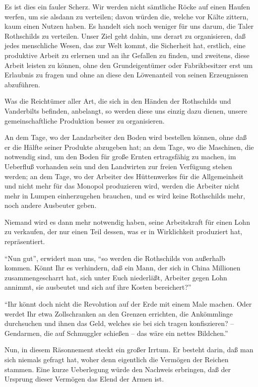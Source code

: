 \documentclass{scrbook}
\begin{document}
Es ist dies ein fauler Scherz. Wir werden nicht sämtliche Röcke auf einen Haufen werfen, um sie alsdann zu verteilen; davon würden die, welche vor Kälte zittern, kaum einen Nutzen haben. Es handelt sich noch weniger für uns darum, die Taler Rothschilds zu verteilen. Unser Ziel geht dahin, uns derart zu organisieren, daß jedes menschliche Wesen, das zur Welt kommt, die Sicherheit hat, erstlich, eine produktive Arbeit zu erlernen und an ihr Gefallen zu finden, und zweitens, diese Arbeit leisten zu können, ohne den Grundeigentümer oder Fabrikbesitzer erst um Erlaubnis zu fragen und ohne an diese den Löwenanteil von seinen Erzeugnissen abzuführen.

Was die Reichtümer aller Art, die sich in den Händen der Rothschilds und Vanderbilts befinden, anbelangt, so werden diese uns einzig dazu dienen, unsere gemeinschaftliche Produktion besser zu organisieren.

An dem Tage, wo der Landarbeiter den Boden wird bestellen können, ohne daß er die Hälfte seiner Produkte abzugeben hat; an dem Tage, wo die Maschinen, die notwendig sind, um den Boden für große Ernten ertragsfähig zu machen, im Ueberfluß vorhanden sein und den Landwirten zur freien Verfügung stehen werden; an dem Tage, wo der Arbeiter des Hüttenwerkes für die Allgemeinheit und nicht mehr für das Monopol produzieren wird, werden die Arbeiter nicht mehr in Lumpen einherzugehen brauchen, und es wird keine Rothschilds mehr, noch andere Ausbeuter geben.

Niemand wird es dann mehr notwendig haben, seine Arbeitskraft für einen Lohn zu verkaufen, der nur einen Teil dessen, was er in Wirklichkeit produziert hat, repräsentiert.

``Nun gut'', erwidert man uns, ``so werden die Rothschilds von außerhalb kommen. Könnt Ihr es verhindern, daß ein Mann, der sich in China Millionen zusammengescharrt hat, sich unter Euch niederläßt, Arbeiter gegen Lohn annimmt, sie ausbeutet und sich auf ihre Kosten bereichert?''

``Ihr könnt doch nicht die Revolution auf der Erde mit einem Male machen. Oder werdet Ihr etwa Zollschranken an den Grenzen errichten, die Ankömmlinge durchsuchen und ihnen das Geld, welches sie bei sich tragen konfiszieren? – Gendarmen, die auf Schmuggler schießen – das wäre ein nettes Bildchen.''

Nun, in diesem Räsonnement steckt ein großer Irrtum. Er besteht darin, daß man sich niemals gefragt hat, woher denn eigentlich die Vermögen der Reichen stammen. Eine kurze Ueberlegung würde den Nachweis erbringen, daß der Ursprung dieser Vermögen das Elend der Armen ist.
\end{document}
